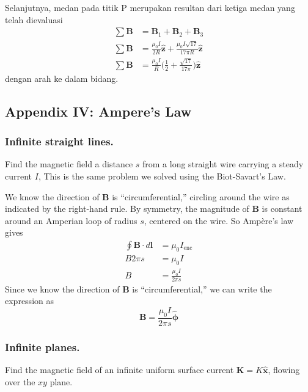\documentclass[../../../main.tex]{subfiles}
\begin{document}
Selanjutnya, medan pada titik P merupakan resultan dari ketiga medan yang telah dievaluasi
\begin{align*}
    \sum \mathbf{B}& =\mathbf{B}_1+\mathbf{B}_2+\mathbf{B}_3\\
    \sum \mathbf{B}& =\frac{\mu_0 I}{2R}\mathbf{\hat{z}}+\frac{\mu_0 I\sqrt{17}}{17\pi R} \mathbf{\hat{z}}\\
    \sum \mathbf{B}& =\frac{\mu_0 I}{R}\biggl(\frac{1}{2}+\frac{\sqrt{17}}{17\pi}\biggr)\mathbf{\hat{z}}
\end{align*}
dengan arah ke dalam bidang.

\subsection*{Appendix IV: Ampere's Law}
\subsubsection*{Inﬁnite straight lines.} Find the magnetic ﬁeld a distance $s$ from a long straight wire carrying a steady current $I$, This is the same problem we solved using the Biot-Savart's Law. 

We know the direction of \textbf{B} is “circumferential,” circling around the wire as indicated by the right-hand rule. By symmetry, the magnitude of \textbf{B} is constant around an Amperian loop of radius $s$, centered on the wire. So Ampère’s law gives
\begin{align*}
    \oint \mathbf{B}\cdot d\mathbf{l}&=\mu_0I_{\text{enc}}\\
    B2\pi s&=\mu_0I\\
    B&=\frac{\mu_0I}{2\pi s}
\end{align*}
Since we know the direction of \textbf{B} is “circumferential,” we can write the expression as 
\begin{equation*}
    \mathbf{B}=\frac{\mu_0I}{2\pi s}\boldsymbol{\hat{\phi}}
\end{equation*}
\begin{figure*}[ht]
    \centering
\end{figure*}

\subsubsection*{Inﬁnite planes.} Find the magnetic ﬁeld of an inﬁnite uniform surface current 
$\mathbf{K} = K \mathbf{\hat{x}}$, ﬂowing over the $xy$ plane. 
\end{document}
